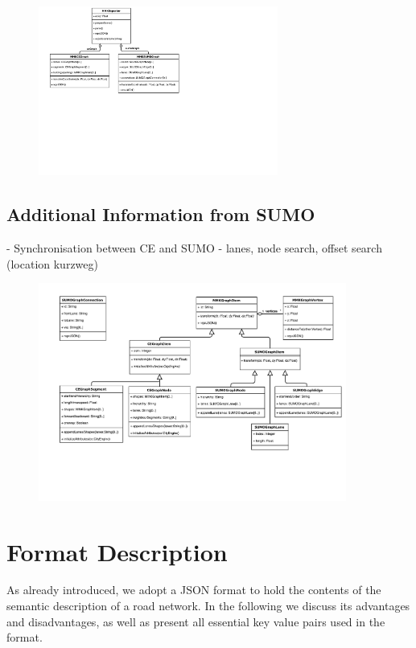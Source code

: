 \begin{figure}[htb]
	\centering
	\includegraphics[width=0.7\textwidth]{figures/ce-overview-uml}
	\label{fig:ce-overview-uml}
	\caption{}
\end{figure}

\subsection{Additional Information from SUMO}
- Synchronisation between CE and SUMO - lanes, node search, offset search (location kurzweg)
\begin{figure}[htb]
	\centering
	\includegraphics[width=0.9\textwidth]{figures/ce-uml}
	\label{fig:ce-uml}
	\caption{}
\end{figure}

\section{Format Description}
\label{sec:format}
As already introduced, we adopt a JSON format to hold the contents of the semantic description of a road network. In the following we discuss its advantages and disadvantages, as well as present all essential key value pairs used in the format.

